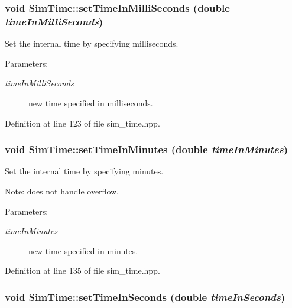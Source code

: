 \subsubsection{\setlength{\rightskip}{0pt plus 5cm}void Sim\-Time::set\-Time\-In\-Milli\-Seconds (double {\em time\-In\-Milli\-Seconds})\hspace{0.3cm}{\tt  [inline]}}\label{classSimTime_f720e375d0d99c1a83d49957a4dfd2cd}


Set the internal time by specifying milliseconds. 

\begin{Desc}
\item[Parameters:]
\begin{description}
\item[{\em time\-In\-Milli\-Seconds}]new time specified in milliseconds. \end{description}
\end{Desc}


Definition at line 123 of file sim\_\-time.hpp.
\subsubsection{\setlength{\rightskip}{0pt plus 5cm}void Sim\-Time::set\-Time\-In\-Minutes (double {\em time\-In\-Minutes})\hspace{0.3cm}{\tt  [inline]}}\label{classSimTime_20bef1aec2826e2e3afb5e173e036edc}


Set the internal time by specifying minutes. 

Note: does not handle overflow. \begin{Desc}
\item[Parameters:]
\begin{description}
\item[{\em time\-In\-Minutes}]new time specified in minutes. \end{description}
\end{Desc}


Definition at line 135 of file sim\_\-time.hpp.
\subsubsection{\setlength{\rightskip}{0pt plus 5cm}void Sim\-Time::set\-Time\-In\-Seconds (double {\em time\-In\-Seconds})\hspace{0.3cm}{\tt  [inline]}}\label{classSimTime_58a06868d2a01a1ed4bef8134f3ac615}


